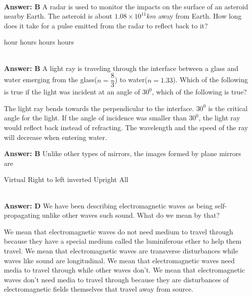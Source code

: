 \documentclass[12pt,addpoints]{exam}
\begin{document}
{{{\begin{questions}
\begin{oneparchoices}
					\end{oneparchoices}
					\\ \textbf{Answer: B}
					\question A radar is used to monitor the impacts on the surface of an asteroid nearby Earth. The asteroid is about $1.08\times10^{11}km$ away from Earth. How long does it take for a pulse emitted from the radar to reflect back to it?\\
					\begin{oneparchoices}
						 hour
						 hours
						 hours
						 hours
					\end{oneparchoices}
					\\ \textbf{Answer: B}
					\question A light ray is traveling through the interface between a glass and water emerging from the glass($n=\dfrac{8}{3}$) to water($n=1.33$). Which of the following is true if the light was incident at an angle of $30^0$, which of the following is true?
					\begin{choices}
						\choice The light ray bends towards the perpendicular to the interface.
						\choice $30^0$ is the critical angle for the light.
						\choice If the angle of incidence was smaller than $30^0$, the light ray would reflect back instead of refracting.
						\choice The wavelength and the speed of the ray will decrease when entering water.
					\end{choices}
					\textbf{Answer: B}
					\question Unlike other types of mirrors, the images formed by plane mirrors are \\
					\begin{oneparchoices}
						\choice Virtual
						\choice Right to left inverted
						\choice Upright
						\choice All
					\end{oneparchoices}
					\\ \textbf{Answer: D}
					\question We have been describing electromagnetic waves as being self-propagating unlike other waves such sound. What do we mean by that?
					\begin{choices}
						\choice We mean that electromagnetic waves do not need medium to travel through because they have a special medium called the luminiferous ether to help them travel.
						\choice We mean that electromagnetic waves are transverse disturbances while waves like sound are longitudinal.
						\choice We mean that electromagnetic waves need media to travel through while other waves don't.
						\choice We mean that electromagnetic waves don't need media to travel through because they are disturbances of electromagnetic fields themselves that travel away from source.

\end{choices}
\end{questions}}}}
\end{document}
